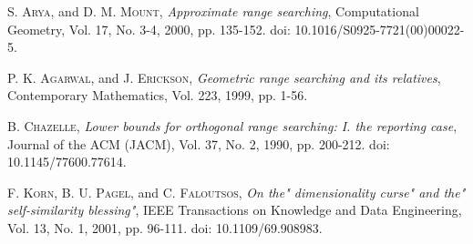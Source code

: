 \documentclass[preprint,12pt]{elsarticle}
\begin{document}
\begin{thebibliography}{00}
 \textsc{S. Arya}, and \textsc{D. M. Mount},
\textit{Approximate range searching}, Computational Geometry, Vol. 17, No. 3-4, 2000, pp. 135-152. doi: 10.1016/S0925-7721(00)00022-5.

 \textsc{P. K. Agarwal}, and \textsc{J. Erickson},
\textit{Geometric range searching and its relatives}, Contemporary Mathematics, Vol. 223, 1999, pp. 1-56.

 \textsc{B. Chazelle},
\textit{Lower bounds for orthogonal range searching: I. the reporting case}, Journal of the ACM (JACM), Vol. 37, No. 2, 1990, pp. 200-212. doi: 10.1145/77600.77614.

 \textsc{F. Korn, B. U. Pagel}, and \textsc{C. Faloutsos},
\textit{On the" dimensionality curse" and the" self-similarity blessing"}, IEEE Transactions on Knowledge and Data Engineering, Vol. 13, No. 1, 2001, pp. 96-111. doi: 10.1109/69.908983.

\end{thebibliography}
\end{document}
